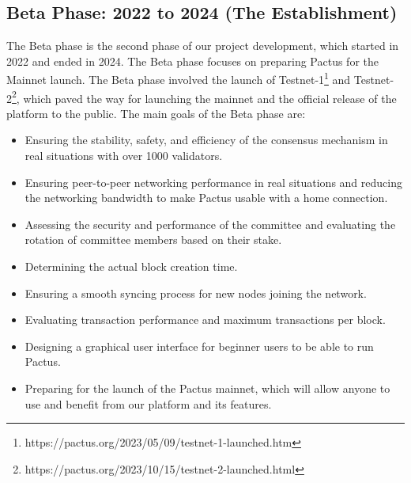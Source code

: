 \documentclass{novel}
\begin{document}
\subsection{Beta Phase: 2022 to 2024 (The Establishment)}
The Beta phase is the second phase of our project development, which started in 2022 and ended in 2024. The Beta phase focuses on preparing Pactus for the Mainnet launch. The Beta phase involved the launch of Testnet-1\footnote{https://pactus.org/2023/05/09/testnet-1-launched.htm} and Testnet-2\footnote{https://pactus.org/2023/10/15/testnet-2-launched.html}, which paved the way for launching the mainnet and the official release of the platform to the public. The main goals of the Beta phase are:
\begin{itemize}
  \item
        Ensuring the stability, safety, and efficiency of the consensus mechanism in real situations with over 1000 validators.
  \item
        Ensuring peer-to-peer networking performance in real situations and reducing the networking bandwidth to make Pactus usable with a home connection.
  \item
        Assessing the security and performance of the committee and evaluating the rotation of committee members based on their stake.
  \item
        Determining the actual block creation time.
  \item
        Ensuring a smooth syncing process for new nodes joining the network.
  \item
        Evaluating transaction performance and maximum transactions per block.
  \item
        Designing a graphical user interface for beginner users to be able to run Pactus.
  \item
        Preparing for the launch of the Pactus mainnet, which will allow anyone to use and benefit from our platform and its features.
\end{itemize}
\end{document}
